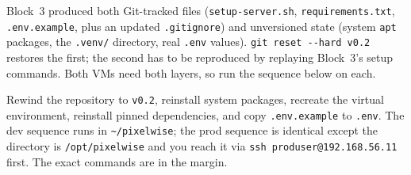 
 Block~3 produced both Git-tracked
files (\texttt{setup-server.sh}, \texttt{requirements.txt},
\texttt{.env.example}, plus an updated \texttt{.gitignore}) and
unversioned state (system \texttt{apt} packages, the \texttt{.venv/}
directory, real \texttt{.env} values). \texttt{git reset -{}-hard v0.2}
restores the first; the second has to be reproduced by replaying Block~3's
setup commands. Both VMs need both layers, so run the sequence below on
each.

Rewind the repository to \texttt{v0.2}, reinstall system packages, recreate
the virtual environment, reinstall pinned dependencies, and copy
\texttt{.env.example} to \texttt{.env}. The dev sequence runs in
\texttt{\textasciitilde/pixelwise}; the prod sequence is identical except
the directory is \texttt{/opt/pixelwise} and you reach it via
\texttt{ssh produser@192.168.56.11} first. The exact commands are in the
margin.




